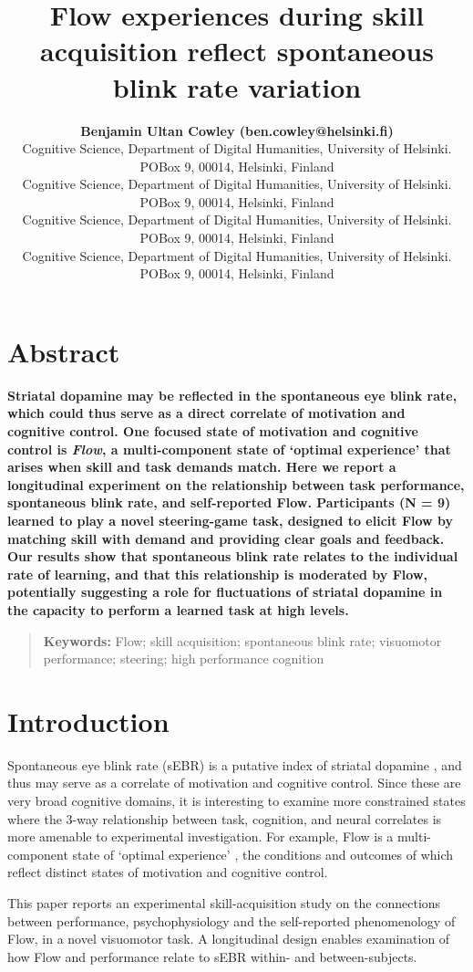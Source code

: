 \documentclass[10pt,letterpaper,floatsintext]{article}
\title{Flow experiences during skill acquisition reflect spontaneous blink rate variation}
\author{{\large \bf Benjamin Ultan Cowley (ben.cowley@helsinki.fi)} \\
  Cognitive Science, Department of Digital Humanities, University of Helsinki. POBox 9, 00014, Helsinki, Finland
  \AND {\large \bf Roosa Frantsi (roosa.frantsi@helsinki.fi)} \\
	  Cognitive Science, Department of Digital Humanities, University of Helsinki. POBox 9, 00014, Helsinki, Finland
  \AND {\large \bf Pasi P\"{o}l\"{o}nen (pasi.polonen@helsinki.fi)} \\
	  Cognitive Science, Department of Digital Humanities, University of Helsinki. POBox 9, 00014, Helsinki, Finland
  \AND {\large \bf Ville-Pekka Inkil\"{a} (ville-pekka.inkile@helsinki.fi)} \\
	  Cognitive Science, Department of Digital Humanities, University of Helsinki. POBox 9, 00014, Helsinki, Finland
  }
\begin{document}
\maketitle


\section{Abstract}
{
\bf
Striatal dopamine may be reflected in the spontaneous eye blink rate, which could thus serve as a direct correlate of motivation and cognitive control. One focused state of motivation and cognitive control is \textit{Flow}, a multi-component state of `optimal experience' that arises when skill and task demands match. Here we report a longitudinal experiment on the relationship between task performance, spontaneous blink rate, and self-reported Flow. Participants (N = 9) learned to play a novel steering-game task, designed to elicit Flow by matching skill with demand and providing clear goals and feedback. Our results show that spontaneous blink rate relates to the individual rate of learning, and that this relationship is moderated by Flow, potentially suggesting a role for fluctuations of striatal dopamine in the capacity to perform a learned task at high levels.
}
\begin{quote}
\small
\textbf{Keywords:}
Flow; skill acquisition; spontaneous blink rate; visuomotor performance; steering; high performance cognition
\end{quote}


\section{Introduction}

Spontaneous eye blink rate (sEBR) is a putative index of striatal dopamine \cite{Slagter2012}, and thus may serve as a correlate of motivation and cognitive control. Since these are very broad cognitive domains, it is interesting to examine more constrained states where the 3-way relationship between task, cognition, and neural correlates is more amenable to experimental investigation. For example, Flow is a multi-component state of `optimal experience' \cite{Csikszentmihalyi1975}, the conditions and outcomes of which reflect distinct states of motivation and cognitive control.

This paper reports an experimental skill-acquisition study on the connections between performance, psychophysiology and the self-reported phenomenology of Flow, in a novel visuomotor task. A longitudinal design enables examination of how Flow and performance relate to sEBR within- and between-subjects.
\end{document}
